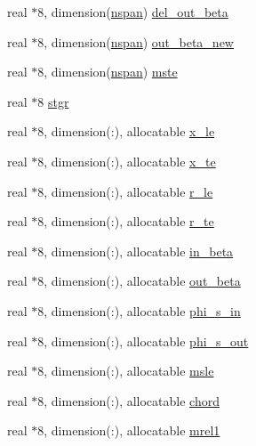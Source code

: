 \begin{DoxyCompactItemize}
\item 
real $\ast$8, dimension(\hyperlink{namespaceglobvar_adeb7d084c25deee7802eab03d40830c5}{nspan}) \hyperlink{namespaceglobvar_a6448057e4ac1ead4b9b9fa353a168a08}{del\+\_\+out\+\_\+beta}
\item 
real $\ast$8, dimension(\hyperlink{namespaceglobvar_adeb7d084c25deee7802eab03d40830c5}{nspan}) \hyperlink{namespaceglobvar_a07729166d5dd2b6a73e99fa9f7f4c3fc}{out\+\_\+beta\+\_\+new}
\item 
real $\ast$8, dimension(\hyperlink{namespaceglobvar_adeb7d084c25deee7802eab03d40830c5}{nspan}) \hyperlink{namespaceglobvar_a4f0ab349408ce25b662d33a12ec6993e}{mste}
\item 
real $\ast$8 \hyperlink{namespaceglobvar_aca622d395a1e0e4edb15a47f52e6352f}{stgr}
\item 
real $\ast$8, dimension(\+:), allocatable \hyperlink{namespaceglobvar_a97f6e6fb7adb402ab21940c4d160585c}{x\+\_\+le}
\item 
real $\ast$8, dimension(\+:), allocatable \hyperlink{namespaceglobvar_a68ad26d59e4d62a30908beaf98bdb89d}{x\+\_\+te}
\item 
real $\ast$8, dimension(\+:), allocatable \hyperlink{namespaceglobvar_acdf6123c5a99341b8318439c395573a5}{r\+\_\+le}
\item 
real $\ast$8, dimension(\+:), allocatable \hyperlink{namespaceglobvar_aa65d26a2d56169f3f2c0ad70408868f2}{r\+\_\+te}
\item 
real $\ast$8, dimension(\+:), allocatable \hyperlink{namespaceglobvar_a3b0ba34304a646f87d0ee37d4b8d8618}{in\+\_\+beta}
\item 
real $\ast$8, dimension(\+:), allocatable \hyperlink{namespaceglobvar_ac973fc13b42ddc6cb1c35762966c4f96}{out\+\_\+beta}
\item 
real $\ast$8, dimension(\+:), allocatable \hyperlink{namespaceglobvar_afc0c5598225e6044c065125b3a4abb11}{phi\+\_\+s\+\_\+in}
\item 
real $\ast$8, dimension(\+:), allocatable \hyperlink{namespaceglobvar_a9a3ae0b7ec948af43ece3fee824e7da2}{phi\+\_\+s\+\_\+out}
\item 
real $\ast$8, dimension(\+:), allocatable \hyperlink{namespaceglobvar_a5aa8f63b0ed7052d09ff37dd0a505100}{msle}
\item 
real $\ast$8, dimension(\+:), allocatable \hyperlink{namespaceglobvar_a7b5f7850dbc4bf45b1c0477fe23101fd}{chord}
\item 
real $\ast$8, dimension(\+:), allocatable \hyperlink{namespaceglobvar_a0678586794cf430f0626766f74f99789}{mrel1}

\end{DoxyCompactItemize}

